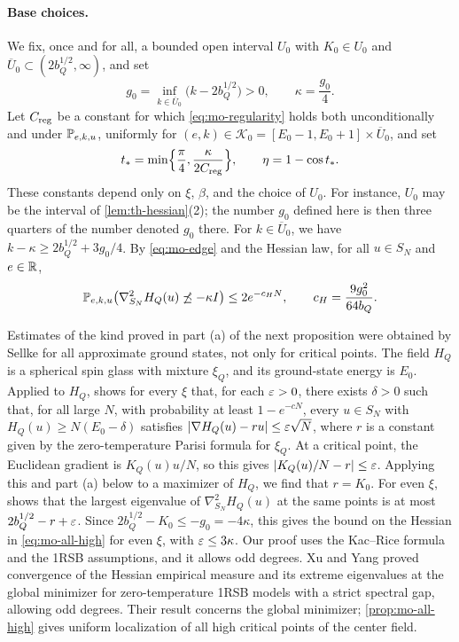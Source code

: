 \paragraph{Base choices.}
We fix, once and for all, a bounded open interval $U_0$ with $K_0\in U_0$ and $\overline U_0\subset(2b_Q^{1/2},\infty)$, and set
\begin{equation}\label{eq:mo-base}
g_0=\inf_{k\in\overline U_0}\bigl(k-2b_Q^{1/2}\bigr)>0,\qquad\kappa=\frac{g_0}4.
\end{equation}
Let $C_{\rm reg}$ be a constant for which \eqref{eq:mo-regularity} holds both unconditionally and under $\mathbb P_{e,k,u}$, uniformly for $(e,k)\in\mathcal K_0=[E_0-1,E_0+1]\times\overline U_0$, and set
\begin{equation}\label{eq:mo-eta}
t_*=\min\Bigl\{\frac\pi4,\frac\kappa{2C_{\rm reg}}\Bigr\},\qquad\eta=1-\cos t_*.
\end{equation}
These constants depend only on $\xi$, $\beta$, and the choice of $U_0$. For instance, $U_0$ may be the interval of \cref{lem:th-hessian}(2); the number $g_0$ defined here is then three quarters of the number denoted $g_0$ there. For $k\in\overline U_0$, we have $k-\kappa\ge2b_Q^{1/2}+3g_0/4$. By \eqref{eq:mo-edge} and the Hessian law, for all $u\in S_N$ and $e\in\mathbb R$,
\begin{equation}\label{eq:mo-hessian-fail}
\mathbb P_{e,k,u}\bigl(\nabla_{S_N}^2H_Q(u)\not\preceq-\kappa I\bigr)\le2e^{-c_HN},\qquad c_H=\frac{9g_0^2}{64b_Q}.
\end{equation}

Estimates of the kind proved in part (a) of the next proposition were obtained by Sellke for all approximate ground states, not only for critical points. The field $H_Q$ is a spherical spin glass with mixture $\xi_Q$, and its ground-state energy is $E_0$. Applied to $H_Q$, \cite[Proposition~1.2]{Sellke2025marginal} shows for every $\xi$ that, for each $\varepsilon>0$, there exists $\delta>0$ such that, for all large $N$, with probability at least $1-e^{-cN}$, every $u\in S_N$ with $H_Q(u)\ge N(E_0-\delta)$ satisfies $|\nabla H_Q(u)-ru|\le\varepsilon\sqrt N$, where $r$ is a constant given by the zero-temperature Parisi formula for $\xi_Q$. At a critical point, the Euclidean gradient is $K_Q(u)u/N$, so this gives $|K_Q(u)/N-r|\le\varepsilon$. Applying this and part (a) below to a maximizer of $H_Q$, we find that $r=K_0$. For even $\xi$, \cite[Theorem~1.3]{Sellke2025marginal} shows that the largest eigenvalue of $\nabla_{S_N}^2H_Q(u)$ at the same points is at most $2b_Q^{1/2}-r+\varepsilon$. Since $2b_Q^{1/2}-K_0\le-g_0=-4\kappa$, this gives the bound on the Hessian in \eqref{eq:mo-all-high} for even $\xi$, with $\varepsilon\le3\kappa$. Our proof uses the Kac--Rice formula and the 1RSB assumptions, and it allows odd degrees. Xu and Yang \cite[Theorem~1.3]{XuYang2025} proved convergence of the Hessian empirical measure and its extreme eigenvalues at the global minimizer for zero-temperature 1RSB models with a strict spectral gap, allowing odd degrees. Their result concerns the global minimizer; \cref{prop:mo-all-high} gives uniform localization of all high critical points of the center field.

